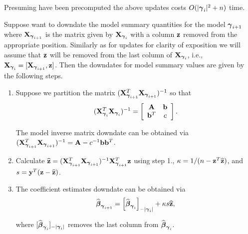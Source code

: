 \documentclass{article}[12pt]
\begin{document}
\noindent Presuming  have been precomputed
the above updates costs $O(|{\boldsymbol \gamma}_{i}|^2 + n)$ time.

Suppose want to downdate the model summary quantities for the model
${\boldsymbol \gamma}_{i+1}$ where ${\bf X}_{{\boldsymbol \gamma}_{i+1}}$ is the matrix given by 
${\bf X}_{{\boldsymbol \gamma}_i}$ with a column ${\bf z}$ removed from the appropriate position.
Similarly as for updates for clarity of exposition we will assume that
${\bf z}$ will be removed from the last column of ${\bf X}_{{\boldsymbol \gamma}_i}$, i.e., 
${\bf X}_{{\boldsymbol \gamma}_{i}} = [{\bf X}_{{\boldsymbol \gamma}_{i+1}}, {\bf z}]$. 
Then the downdates for model summary values are given by the following steps.
\begin{enumerate}
	\item 
	Suppose we partition the matrix
	 $({\bf X}_{{\boldsymbol \gamma}_{i+1}}^T{\bf X}_{{\boldsymbol \gamma}_{i+1}})^{-1}$ so that
	$$
	\displaystyle ({\bf X}_{{\boldsymbol \gamma}_{i}}^T{\bf X}_{{\boldsymbol \gamma}_{i}})^{-1} 
	= \left[ \begin{array}{cc}
	{\bf A}   & {\bf b} \\
	{\bf b}^T & c \\
	\end{array} \right].
	$$
	
	\noindent The model inverse matrix downdate can be obtained
	via   $({\bf X}_{{\boldsymbol \gamma}_{i+1}}^T{\bf X}_{{\boldsymbol \gamma}_{i+1}})^{-1} = {\bf A} - c^{-1}{\bf b}{\bf b}^T$.
	
	\item Calculate
	$\widehat{{\bf z}} = ({\bf X}_{{\boldsymbol \gamma}_{i+1}}^T{\bf X}_{{\boldsymbol \gamma}_{i+1}})^{-1}{\bf X}_{{\boldsymbol \gamma}_{i+1}}^T{\bf z}$ using step 1.,
	$\kappa = 1/(n - {\bf z}^T\widehat{{\bf z}})$,
	and $s = {\bf y}^T({\bf z} - \widehat{{\bf z}})$.
	
	\item 
	The coefficient estimates downdate can be obtained
	via
	$$
	\widehat{{\boldsymbol \beta}}_{{\boldsymbol \gamma}_{i+1}} = \left[ \widehat{{\boldsymbol \beta}}_{{\boldsymbol \gamma}_{i}} \right]_{-|{{\boldsymbol \gamma}_{i}}|} + \kappa s\widehat{{\bf z}},
	$$
	
	\noindent where $[ \widehat{{\boldsymbol \beta}}_{{\boldsymbol \gamma}_{i}}]_{-|{{\boldsymbol \gamma}_{i}}|}$
	removes the last column from $\widehat{{\boldsymbol \beta}}_{{\boldsymbol \gamma}_{i}}$.
	

\end{enumerate}
\end{document}
